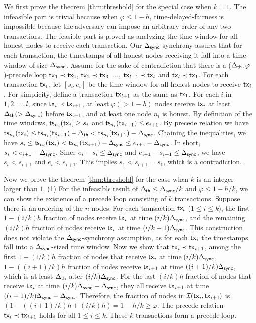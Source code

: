 We first prove the theorem \ref{thm:threshold} for the special case when $k=1$. The infeasible part is trivial because when $\varphi\le 1-h$, time-delayed-fairness is impossible because the adversary can impose an arbitrary order of any two transactions. The feasible part is proved as analyzing the time window for all honest nodes to receive each transaction. Our $\Delta_{\mathsf{sync}}$-synchrony assures that for each transaction, the timestamps of all honest nodes receiving it fall into a time window of size $\Delta_{\mathsf{sync}}$. Assume for the sake of contradiction that there is a ($\Delta_{\mathsf{th}}, \varphi$)-precede loop $\mathsf{tx}_1\prec \mathsf{tx}_2$, $\mathsf{tx}_2\prec \mathsf{tx}_3$, $\ldots$, $\mathsf{tx}_{l-1}\prec \mathsf{tx}_l$ and $\mathsf{tx}_l\prec \mathsf{tx}_1$. For each transaction $\mathsf{tx}_i$, let $[s_i, e_i]$ be the time window for all honest nodes to receive $\mathsf{tx}_i$. For simplicity, define a transaction $\mathsf{tx}_{l+1}$ as the same as $\mathsf{tx}_1$. For each $i$ in $1,2,\dots, l$, since $\mathsf{tx}_i\prec\mathsf{tx}_{i+1}$, at least $\varphi(>1-h)$ nodes receive $\mathsf{tx}_i$ at least  $\Delta_{\mathsf{th}}(>\Delta_{\mathsf{sync}})$ before $\mathsf{tx}_{i+1}$, and at least one node $n_i$ is honest. By definition of the time windows, $\mathsf{ts}_{n_i}(\mathsf{tx}_i)\ge s_i$ and $\mathsf{ts}_{n_i}(\mathsf{tx}_{i+1})\le e_{i+1}$. By precede relation we have $\mathsf{ts}_{n_i}(\mathsf{tx}_i)\le \mathsf{ts}_{n_i}(\mathsf{tx}_{i+1})-\Delta_{\mathsf{th}} < \mathsf{ts}_{n_i}(\mathsf{tx}_{i+1})-\Delta_{\mathsf{sync}}$. Chaining the inequalities, we have $s_i\le \mathsf{ts}_{n_i}(\mathsf{tx}_i)<\mathsf{ts}_{n_i}(\mathsf{tx}_{i+1})-\Delta_{\mathsf{sync}} \le e_{i+1} - \Delta_{\mathsf{sync}}$. In short, $s_i<e_{i+1}-\Delta_{\mathsf{sync}}$. Since $e_i-s_i\le \Delta_{\mathsf{sync}}$ and $e_{i+1}-s_{i+1}\le \Delta_{\mathsf{sync}}$, we have $s_i<s_{i+1}$ and $e_i<e_{i+1}$. This implies $s_1<s_{l+1}=s_1$, which is a contradiction. 


Now we prove the theorem \ref{thm:threshold} for the case when $k$ is an integer larger than $1$. (1) For the infeasible result of $\Delta_{\mathsf{th}}\le \Delta_{\mathsf{sync}}/k$ and $\varphi\le 1-h/k$, we can show the existence of a precede loop consisting of $k$ transactions. Suppose there is an ordering of the $n$ nodes. For each transaction $\mathsf{tx}_i$ ($1\le i\le k$), the first $1-(i/k)h$ fraction of nodes receive $\mathsf{tx}_i$ at time $(i/k)\Delta_{\mathsf{sync}}$, and the remaining $(i/k) h$ fraction of nodes receive $\mathsf{tx}_i$ at time $(i/k-1)\Delta_{\mathsf{sync}}$.  This construction does not violate the $\Delta_{\mathsf{sync}}$-synchrony assumption, as for each $\mathsf{tx}_i$ the timestamps fall into a $\Delta_{\mathsf{sync}}$-sized time window. Now we show that $\mathsf{tx}_i\prec \mathsf{tx}_{i+1}$, among the first $1-(i/k)h$ fraction of nodes that receive $\mathsf{tx}_i$ at time $(i/k)\Delta_{\mathsf{sync}}$, $1-((i+1)/k)h$ fraction of nodes receive $\mathsf{tx}_{i+1}$ at time $((i+1)/k)\Delta_{\mathsf{sync}}$, which is at least $\Delta_{\mathsf{th}}$ after $(i/k)\Delta_{\mathsf{sync}}$. For the last $(i/k)h$ fraction of nodes that receive $\mathsf{tx}_i$ at time $(i/k)\Delta_{\mathsf{sync}}-\Delta_{\mathsf{sync}}$, they all receive $\mathsf{tx}_{i+1}$ at time $((i+1)/k)\Delta_{\mathsf{sync}}-\Delta_{\mathsf{sync}}$. Therefore, the fraction of nodes in $\mathcal{I}(\mathsf{tx}_{i},\mathsf{tx}_{i+1})$ is $(1-((i+1)/k)h + (i/k)h)=1-h/k\ge \varphi$. The precede relation $\mathsf{tx}_i\prec \mathsf{tx}_{i+1}$ holds for all $1\le i\le k$. These $k$ transactions form a precede loop. 

